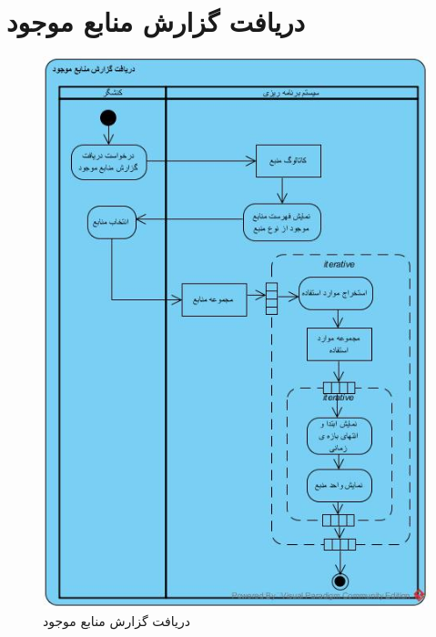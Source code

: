 \section{دریافت گزارش منابع موجود}
\begin{figure}[H]
	\centering
	\includegraphics[scale=0.7]{img/activity/AvailableResourcesReport}
	\caption{دریافت گزارش منابع موجود}
\end{figure}


